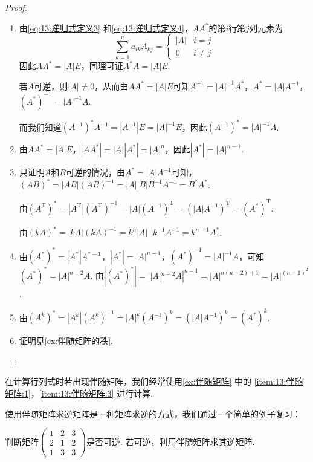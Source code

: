 \begin{proof}
    \begin{enumerate}
        \item 由\autoref{eq:13:递归式定义3} 和\autoref{eq:13:递归式定义4}，$AA^*$的第$i$行第$j$列元素为
              \[\sum_{k=1}^{n}a_{ik}A_{kj}=\begin{cases}
                      |A| & i=j      \\
                      0   & i \neq j
                  \end{cases}\]
              因此$AA^*=|A|E$，同理可证$A^*A=|A|E$.

              若$A$可逆，则$|A| \neq 0$，从而由$AA^*=|A|E$可知$A^{-1}=|A|^{-1}A^*$，$A^*=|A|A^{-1}$，$(A^*)^{-1}=|A|^{-1}A$.

              而我们知道$(A^{-1})^*A^{-1}=|A^{-1}|E=|A|^{-1}E$，因此$(A^{-1})^*=|A|^{-1}A$.

        \item 由$AA^*=|A|E$，$|AA^*|=|A||A^*|=|A|^n$，因此$|A^*|=|A|^{n-1}$.

        \item 只证明$A$和$B$可逆的情况，由$A^*=|A|A^{-1}$可知，$(AB)^*=|AB|(AB)^{-1}=|A||B|B^{-1}A^{-1}=B^*A^*$.

              由$(A^\mathrm{T})^*=|A^\mathrm{T}|(A^\mathrm{T})^{-1}=|A|(A^{-1})^\mathrm{T}=(|A|A^{-1})^\mathrm{T}=(A^*)^\mathrm{T}$.

              由$(kA)^*=|kA|(kA)^{-1}=k^n|A|\cdot k^{-1}A^{-1}=k^{n-1}A^*$.

        \item 由$(A^*)^*=|A^*|A^{*-1}$，$|A^*|=|A|^{n-1}$，$(A^*)^{-1}=|A|^{-1}A$，可知$(A^*)^*=|A|^{n-2}A$. 由$|(A^*)^*|=||A|^{n-2}A|^{n-1}=|A|^{n(n-2)+1}=|A|^{(n-1)^2}$.

        \item 由$(A^k)^*=|A^k|(A^k)^{-1}=|A|^k(A^{-1})^k=(|A|A^{-1})^k=(A^*)^k$.

        \item 证明见\autoref{ex:伴随矩阵的秩}.
    \end{enumerate}
\end{proof}

在计算行列式时若出现伴随矩阵，我们经常使用\autoref{ex:伴随矩阵} 中的 \ref*{item:13:伴随矩阵:1}，\ref*{item:13:伴随矩阵:3} 进行计算.

使用伴随矩阵求逆矩阵是一种矩阵求逆的方式，我们通过一个简单的例子复习：

\begin{example}{}{}
    判断矩阵$\begin{pmatrix}
            1 & 2 & 3 \\ 2 & 1 & 2 \\ 1 & 3 & 3
        \end{pmatrix}$是否可逆. 若可逆，利用伴随矩阵求其逆矩阵.
\end{example}

